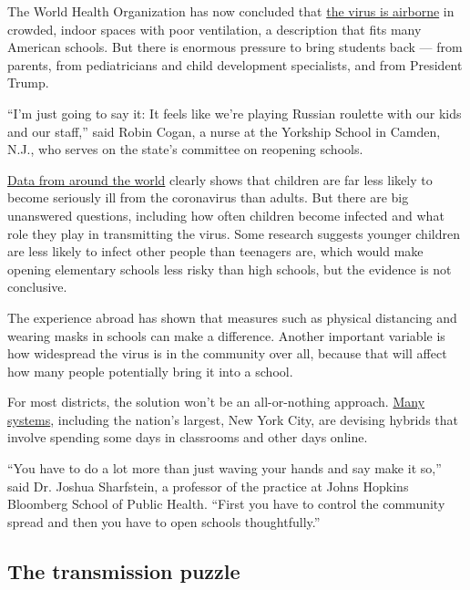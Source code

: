 The World Health Organization has now concluded that
\href{https://slack-redir.net/link?url=https\%3A\%2F\%2Fwww.nytimes.com\%2F2020\%2F07\%2F09\%2Fhealth\%2Fvirus-aerosols-who.html}{the
virus is airborne} in crowded, indoor spaces with poor ventilation, a
description that fits many American schools. But there is enormous
pressure to bring students back --- from parents, from pediatricians and
child development specialists, and from President Trump.

``I'm just going to say it: It feels like we're playing Russian roulette
with our kids and our staff,'' said Robin Cogan, a nurse at the Yorkship
School in Camden, N.J., who serves on the state's committee on reopening
schools.

\href{https://www.cdc.gov/coronavirus/2019-ncov/hcp/pediatric-hcp.html\#burden-disease-risk-factors}{Data
from around the world} clearly shows that children are far less likely
to become seriously ill from the coronavirus than adults. But there are
big unanswered questions, including how often children become infected
and what role they play in transmitting the virus. Some research
suggests younger children are less likely to infect other people than
teenagers are, which would make opening elementary schools less risky
than high schools, but the evidence is not conclusive.

The experience abroad has shown that measures such as physical
distancing and wearing masks in schools can make a difference. Another
important variable is how widespread the virus is in the community over
all, because that will affect how many people potentially bring it into
a school.

For most districts, the solution won't be an all-or-nothing approach.
\href{https://bioethics.jhu.edu/research-and-outreach/projects/eschool-initiative/school-policy-tracker/}{Many
systems}, including the nation's largest, New York City, are devising
hybrids that involve spending some days in classrooms and other days
online.

``You have to do a lot more than just waving your hands and say make it
so,'' said Dr. Joshua Sharfstein, a professor of the practice at Johns
Hopkins Bloomberg School of Public Health. ``First you have to control
the community spread and then you have to open schools thoughtfully.''

\hypertarget{the-transmission-puzzle}{%
\subsection{The transmission puzzle}\label{the-transmission-puzzle}}

